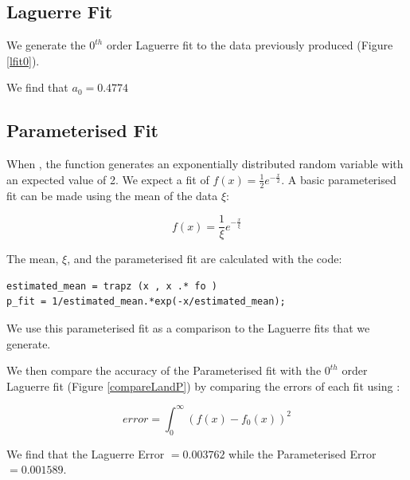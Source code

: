 \documentclass{article}
\begin{document}
\subsection{Laguerre Fit}

We generate the $0^{th}$ order Laguerre fit to the data previously produced (Figure \ref{lfit0}). 

We find that $a_0 = 0.4774$ %

\subsection{Parameterised Fit}

When , the function  generates an exponentially distributed random variable with an expected value of 2. We expect a fit of $f(x) = \frac{1}{2} e^{-\frac{x}{2}}$. A basic parameterised fit can be made using the mean of the data $\xi$:

$$
f(x) = \frac{1}{\xi}e^{-\frac{x}{\xi}}
$$

The mean, $\xi$, and the parameterised fit are calculated with the code:

\begin{lstlisting}
estimated_mean = trapz (x , x .* fo )
p_fit = 1/estimated_mean.*exp(-x/estimated_mean);
\end{lstlisting}




We use this parameterised fit as a comparison to the Laguerre fits that we generate. 

We then compare the accuracy of the Parameterised fit with the $0^{th}$ order Laguerre fit (Figure \ref{compareLandP}) by comparing the errors of each fit using :

$$
error = \int_{0}^{\infty }(f(x)-f_0(x))^2
$$

We find that the Laguerre Error $= 0.003762$ while the Parameterised Error $= 0.001589$. 
\end{document}
